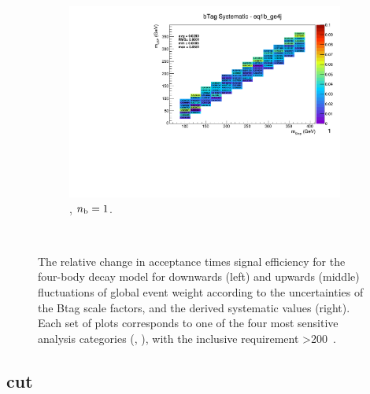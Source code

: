 \begin{figure}[ht!]
\begin{subfigure}[b]{0.32\textwidth}
    \includegraphics[width=\textwidth, page=1]{Figs/sms/t2degen/v19_3/systs/T2_4body_bTag_eq1b_ge4j.pdf}
    \caption{\njhigh, $n_{\text{b}} = 1$.}
  \end{subfigure}\\
  \caption{The relative change in acceptance times signal efficiency for the
  four-body decay model for downwards (left) and upwards (middle) fluctuations
  of global event weight according to the uncertainties of the Btag scale 
  factors,
  and the derived systematic values (right). Each set of plots corresponds
  to one of the four most sensitive analysis categories (\nb, \nj), with the
  inclusive requirement \HT>200~\gev.}
  \label{fig:sms-btag-t2degen}
\end{figure}


\newpage
\subsection*{\mhtmet cut}
\label{sec:t2degen_mhtmet_plots}

